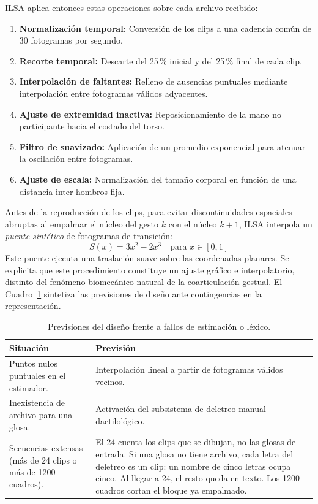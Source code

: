 ILSA aplica entonces estas operaciones sobre cada archivo recibido:
\begin{enumerate}
    \item \textbf{Normalización temporal:} Conversión de los clips a una cadencia común de 30 fotogramas por segundo.
    \item \textbf{Recorte temporal:} Descarte del 25\,\% inicial y del 25\,\% final de cada clip.
    \item \textbf{Interpolación de faltantes:} Relleno de ausencias puntuales mediante interpolación entre fotogramas válidos adyacentes.
    \item \textbf{Ajuste de extremidad inactiva:} Reposicionamiento de la mano no participante hacia el costado del torso.
    \item \textbf{Filtro de suavizado:} Aplicación de un promedio exponencial para atenuar la oscilación entre fotogramas.
    \item \textbf{Ajuste de escala:} Normalización del tamaño corporal en función de una distancia inter-hombros fija.
\end{enumerate}

Antes de la reproducción de los clips, para evitar discontinuidades espaciales abruptas al empalmar el núcleo del gesto $k$ con el núcleo $k+1$, ILSA interpola un \textit{puente sintético} de fotogramas de transición:
\begin{equation}
S(x) = 3x^2 - 2x^3 \quad \text{para } x \in [0, 1]
\label{eq:smoothstep}
\end{equation}
Este puente ejecuta una traslación suave sobre las coordenadas planares. Se explicita que este procedimiento constituye un ajuste gráfico e interpolatorio, distinto del fenómeno biomecánico natural de la coarticulación gestual. El Cuadro~\ref{tab:salvaguardas_pose} sintetiza las previsiones de diseño ante contingencias en la representación.

\begin{table}[H]
  \centering
\small
  \caption{Previsiones del diseño frente a fallos de estimación o léxico.}
  \label{tab:salvaguardas_pose}
  \begin{tabularx}{\textwidth}{@{}>{\raggedright\arraybackslash}p{} >{\raggedright\arraybackslash}X@{}}
    \toprule
    \textbf{Situación} & \textbf{Previsión} \\
    \midrule
    Puntos nulos puntuales en el estimador. & Interpolación lineal a partir de fotogramas válidos vecinos. \\
    \addlinespace[2pt]
    Inexistencia de archivo para una glosa. & Activación del subsistema de deletreo manual dactilológico. \\
    \addlinespace[2pt]
    Secuencias extensas (más de 24 clips o más de 1200 cuadros). & El 24 cuenta los clips que se dibujan, no las glosas de entrada. Si una glosa no tiene archivo, cada letra del deletreo es un clip: un nombre de cinco letras ocupa cinco. Al llegar a 24, el resto queda en texto. Los 1200 cuadros cortan el bloque ya empalmado. \\
    \bottomrule
  \end{tabularx}
\end{table}

